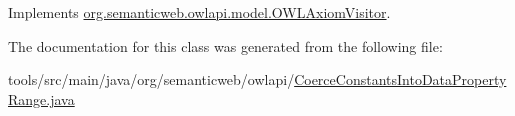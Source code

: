 Implements \hyperlink{interfaceorg_1_1semanticweb_1_1owlapi_1_1model_1_1_o_w_l_axiom_visitor_a3a0d09f0a9f90ce6e0490fbae8d8db10}{org.\-semanticweb.\-owlapi.\-model.\-O\-W\-L\-Axiom\-Visitor}.



The documentation for this class was generated from the following file\-:\begin{DoxyCompactItemize}
\item 
tools/src/main/java/org/semanticweb/owlapi/\hyperlink{_coerce_constants_into_data_property_range_8java}{Coerce\-Constants\-Into\-Data\-Property\-Range.\-java}\end{DoxyCompactItemize}

